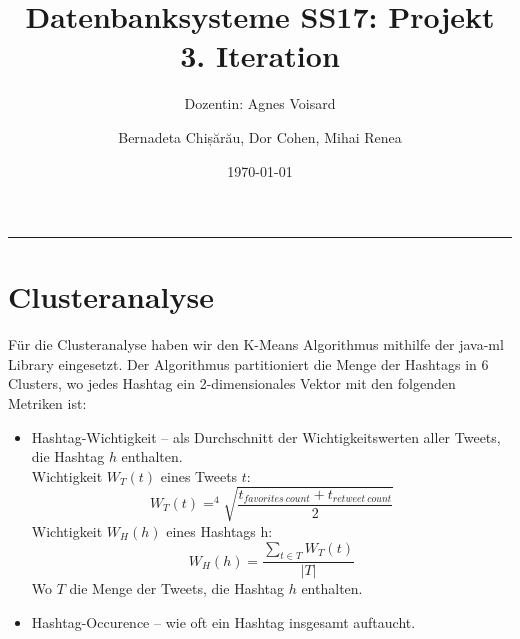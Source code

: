 \documentclass[paper=a4, english, ngerman, romanian]{scrartcl}
\begin{document}
\begin{titlepage}
	\title{Datenbanksysteme SS17: Projekt\\ 3. Iteration}	
	\subtitle{Dozentin: Agnes Voisard}
	\author{Bernadeta Chișărău, Dor Cohen, Mihai Renea}
	\date{\normalsize \today}
\end{titlepage}

\maketitle								%
\vspace*{-8cm}							%

\vspace{7cm}							%
\rule{\linewidth}{0.8pt}				%
	\section{Clusteranalyse}
		Für die Clusteranalyse haben wir den K-Means Algorithmus mithilfe der java-ml Library eingesetzt. Der Algorithmus partitioniert die Menge der Hashtags in 6 Clusters, wo jedes Hashtag ein 2-dimensionales Vektor mit den folgenden Metriken ist:
		\begin{itemize}
			\item Hashtag-Wichtigkeit -- als Durchschnitt der Wichtigkeitswerten aller Tweets, die Hashtag $h$ enthalten.\\
			Wichtigkeit $W_T(t)$ eines Tweets $t$:\\
			\begin{equation*}
				W_T(t) = ^4\sqrt{\frac{t_{favorites\ count} + t_{retweet\ count}}{2}}
			\end{equation*}
			Wichtigkeit $W_H(h)$ eines Hashtags h:
			\begin{equation*}
				W_H(h) = \frac{\sum_{t \in T} W_T(t)}{|T|}
			\end{equation*}
			Wo $T$ die Menge der Tweets, die Hashtag $h$ enthalten.
			
			\item Hashtag-Occurence -- wie oft ein Hashtag insgesamt auftaucht.
		\end{itemize}
		
\end{document}
